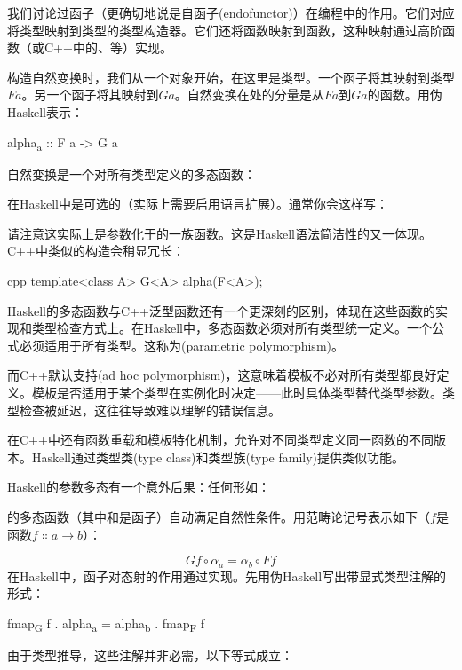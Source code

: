 我们讨论过函子（更确切地说是自函子(endofunctor)）在编程中的作用。它们对应将类型映射到类型的类型构造器。它们还将函数映射到函数，这种映射通过高阶函数（或C++中的、等）实现。

构造自然变换时，我们从一个对象开始，在这里是类型。一个函子将其映射到类型$F a$。另一个函子将其映射到$G a$。自然变换在处的分量是从$F a$到$G a$的函数。用伪Haskell表示：

\begin{snipv}
alpha\textsubscript{a} :: F a -> G a
\end{snipv}
自然变换是一个对所有类型定义的多态函数：

在Haskell中是可选的（实际上需要启用语言扩展）。通常你会这样写：

请注意这实际上是参数化于的一族函数。这是Haskell语法简洁性的又一体现。C++中类似的构造会稍显冗长：

\begin{snip}{cpp}
template<class A> G<A> alpha(F<A>);
\end{snip}
Haskell的多态函数与C++泛型函数还有一个更深刻的区别，体现在这些函数的实现和类型检查方式上。在Haskell中，多态函数必须对所有类型统一定义。一个公式必须适用于所有类型。这称为(parametric polymorphism)。

而C++默认支持(ad hoc polymorphism)，这意味着模板不必对所有类型都良好定义。模板是否适用于某个类型在实例化时决定——此时具体类型替代类型参数。类型检查被延迟，这往往导致难以理解的错误信息。

在C++中还有函数重载和模板特化机制，允许对不同类型定义同一函数的不同版本。Haskell通过类型类(type class)和类型族(type family)提供类似功能。

Haskell的参数多态有一个意外后果：任何形如：

的多态函数（其中和是函子）自动满足自然性条件。用范畴论记号表示如下（$f$是函数$f \Colon a \to b$）：

$$G f \circ \alpha_a = \alpha_b \circ F f$$
在Haskell中，函子对态射的作用通过实现。先用伪Haskell写出带显式类型注解的形式：

\begin{snipv}
fmap\textsubscript{G} f . alpha\textsubscript{a} = alpha\textsubscript{b} . fmap\textsubscript{F} f
\end{snipv}
由于类型推导，这些注解并非必需，以下等式成立：


